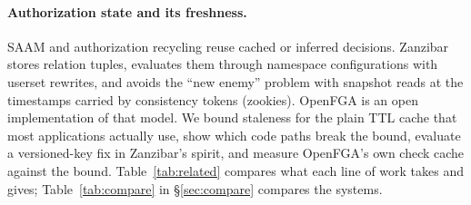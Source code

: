 \documentclass[sigconf,review,anonymous]{acmart}
\begin{document}
\paragraph{Authorization state and its freshness.} SAAM and authorization recycling
\cite{crampton2006saam,wei2008recycling} reuse cached or inferred decisions. Zanzibar \cite{pang2019zanzibar}
stores relation tuples, evaluates them through namespace configurations with userset rewrites, and avoids
the ``new enemy'' problem with snapshot reads at the timestamps carried by consistency tokens (zookies).
OpenFGA \cite{openfga} is an open implementation of that model. We bound staleness for the plain TTL cache that
most applications actually use, show which code paths break the bound, evaluate a versioned-key fix in
Zanzibar's spirit, and measure OpenFGA's own check cache against the bound. Table~\ref{tab:related} compares
what each line of work takes and gives; Table~\ref{tab:compare} in \S\ref{sec:compare} compares the systems.
\end{document}

